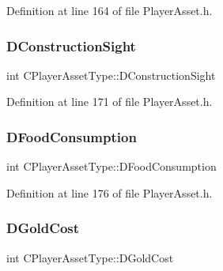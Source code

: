 Definition at line 164 of file Player\+Asset.\+h.

\hypertarget{classCPlayerAssetType_a71b34081d4540087472af3cb9052e04a}{}\label{classCPlayerAssetType_a71b34081d4540087472af3cb9052e04a} 
\subsubsection{\texorpdfstring{D\+Construction\+Sight}{DConstructionSight}}
{\footnotesize\ttfamily int C\+Player\+Asset\+Type\+::\+D\+Construction\+Sight\hspace{0.3cm}{\ttfamily [protected]}}



Definition at line 171 of file Player\+Asset.\+h.

\hypertarget{classCPlayerAssetType_a8fcab35c2b576476b6f2c80c8b8762fb}{}\label{classCPlayerAssetType_a8fcab35c2b576476b6f2c80c8b8762fb} 
\subsubsection{\texorpdfstring{D\+Food\+Consumption}{DFoodConsumption}}
{\footnotesize\ttfamily int C\+Player\+Asset\+Type\+::\+D\+Food\+Consumption\hspace{0.3cm}{\ttfamily [protected]}}



Definition at line 176 of file Player\+Asset.\+h.

\hypertarget{classCPlayerAssetType_a2153f3ed158144fc517efd2866de0017}{}\label{classCPlayerAssetType_a2153f3ed158144fc517efd2866de0017} 
\subsubsection{\texorpdfstring{D\+Gold\+Cost}{DGoldCost}}
{\footnotesize\ttfamily int C\+Player\+Asset\+Type\+::\+D\+Gold\+Cost\hspace{0.3cm}{\ttfamily [protected]}}



